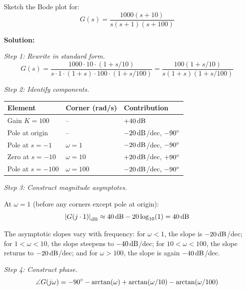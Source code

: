 \begin{example}
\label{ex:complete}
Sketch the Bode plot for:
\begin{equation}
G(s) = \frac{1000(s+10)}{s(s+1)(s+100)}
\end{equation}

\textbf{Solution:}

\textit{Step 1: Rewrite in standard form.}
\begin{equation}
G(s) = \frac{1000 \cdot 10 \cdot (1 + s/10)}{s \cdot 1 \cdot (1+s) \cdot 100 \cdot (1+s/100)} = \frac{100(1+s/10)}{s(1+s)(1+s/100)}
\end{equation}

\textit{Step 2: Identify components.}

\begin{center}
\begin{tabular}{lll}
\toprule
Element & Corner (rad/s) & Contribution \\
\midrule
Gain $K = 100$ & -- & $+40\,\text{dB}$ \\
Pole at origin & -- & $-20\,\text{dB}$/dec, $-90^\circ$ \\
Pole at $s = -1$ & $\omega = 1$ & $-20\,\text{dB}$/dec, $-90^\circ$ \\
Zero at $s = -10$ & $\omega = 10$ & $+20\,\text{dB}$/dec, $+90^\circ$ \\
Pole at $s = -100$ & $\omega = 100$ & $-20\,\text{dB}$/dec, $-90^\circ$ \\
\bottomrule
\end{tabular}
\end{center}

\textit{Step 3: Construct magnitude asymptotes.}

At $\omega = 1$ (before any corners except pole at origin):
\begin{equation}
\left|G(j \cdot 1)\right|_{\text{dB}} \approx 40\,\text{dB} - 20\log_{10}(1) = 40\,\text{dB}
\end{equation}

The asymptotic slopes vary with frequency: for $\omega < 1$, the slope is $-20\,\text{dB}$/dec; for $1 < \omega < 10$, the slope steepens to $-40\,\text{dB}$/dec; for $10 < \omega < 100$, the slope returns to $-20\,\text{dB}$/dec; and for $\omega > 100$, the slope is again $-40\,\text{dB}$/dec.

\textit{Step 4: Construct phase.}
\begin{equation}
\angle G(j\omega) = -90^\circ - \arctan(\omega) + \arctan(\omega/10) - \arctan(\omega/100)
\end{equation}


\end{example}
